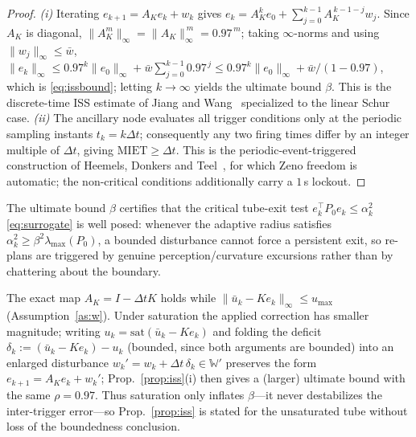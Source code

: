 \begin{proof}
\emph{(i)} Iterating $e_{k+1}=A_Ke_k+w_k$ gives
$e_k=A_K^k e_0+\sum_{j=0}^{k-1}A_K^{\,k-1-j}w_j$. Since $A_K$ is diagonal,
$\|A_K^m\|_\infty=\|A_K\|_\infty^{\,m}=0.97^{\,m}$; taking $\infty$-norms and using
$\|w_j\|_\infty\le\bar w$,
$\|e_k\|_\infty\le 0.97^{k}\|e_0\|_\infty+\bar w\sum_{j=0}^{k-1}0.97^{\,j}
\le 0.97^{k}\|e_0\|_\infty+\bar w/(1-0.97)$,
which is \eqref{eq:issbound}; letting $k\to\infty$ yields the ultimate bound
$\beta$. This is the discrete-time ISS estimate of Jiang and
Wang~\cite{jiangwang2001} specialized to the linear Schur case.
\emph{(ii)} The ancillary node evaluates all trigger conditions only at the
periodic sampling instants $t_k=k\Delta t$; consequently any two firing times
differ by an integer multiple of $\Delta t$, giving $\mathrm{MIET}\ge\Delta t$.
This is the periodic-event-triggered construction of Heemels, Donkers and
Teel~\cite{heemelsdonkersteel2013}, for which Zeno freedom is automatic; the
non-critical conditions additionally carry a $1$\,s lockout.
\end{proof}

\begin{remark}\label{rem:trig}
The ultimate bound $\beta$ certifies that the critical tube-exit test
$e_k^{\!\top}P_0 e_k\le\alpha_k^2$ \eqref{eq:surrogate} is well posed: whenever the
adaptive radius satisfies $\alpha_k^2\ge\beta^2\lambda_{\max}(P_0)$, a bounded
disturbance cannot force a persistent exit, so re-plans are triggered by genuine
perception/curvature excursions rather than by chattering about the boundary.
\end{remark}

\begin{remark}\label{rem:sat}
The exact map $A_K=I-\Delta tK$ holds while $\|\bar u_k-Ke_k\|_\infty\le u_{\max}$
(Assumption~\ref{as:w}). Under saturation the applied correction has smaller
magnitude; writing $u_k=\mathrm{sat}(\bar u_k-Ke_k)$ and folding the deficit
$\delta_k:=(\bar u_k-Ke_k)-u_k$ (bounded, since both arguments are bounded) into
an enlarged disturbance $w_k'=w_k+\Delta t\,\delta_k\in\mathbb{W}'$ preserves the
form $e_{k+1}=A_Ke_k+w_k'$; Prop.~\ref{prop:iss}(i) then gives a (larger) ultimate
bound with the same $\rho=0.97$. Thus saturation only inflates $\beta$—it never
destabilizes the inter-trigger error—so Prop.~\ref{prop:iss} is stated for the
unsaturated tube without loss of the boundedness conclusion.
\end{remark}

